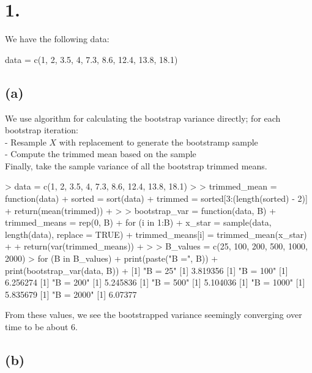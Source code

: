 \documentclass{article}
\begin{document}
\thispagestyle{firstpageheader}
{\Large 

\section*{1.}

We have the following data: 
\begin{spverbatim}
data = c(1, 2, 3.5, 4, 7.3, 8.6, 12.4, 13.8, 18.1)
\end{spverbatim}

\subsection*{(a)} 

We use algorithm for calculating the bootstrap variance directly; for each bootstrap iteration: \\
- Resample \(X\) with replacement to generate the bootstramp sample \\
- Compute the trimmed mean based on the sample \\
Finally, take the sample variance of all the bootstrap trimmed means.

\begin{spverbatim}
> data = c(1, 2, 3.5, 4, 7.3, 8.6, 12.4, 13.8, 18.1)
> 
> trimmed_mean = function(data) {
+   sorted = sort(data)
+   trimmed = sorted[3:(length(sorted) - 2)]
+   return(mean(trimmed))
+ }
> 
> bootstrap_var = function(data, B) {
+   trimmed_means = rep(0, B)
+   for (i in 1:B) {
+     x_star = sample(data, length(data), replace = TRUE)
+     trimmed_means[i] = trimmed_mean(x_star)
+   }
+   return(var(trimmed_means))
+ }
> 
> B_values = c(25, 100, 200, 500, 1000, 2000)
> for (B in B_values) {
+   print(paste("B =", B))
+   print(bootstrap_var(data, B))
+ }
[1] "B = 25"
[1] 3.819356
[1] "B = 100"
[1] 6.256274
[1] "B = 200"
[1] 5.245836
[1] "B = 500"
[1] 5.104036
[1] "B = 1000"
[1] 5.835679
[1] "B = 2000"
[1] 6.07377
\end{spverbatim}

From these values, we see the bootstrapped variance seemingly converging over time to be about 6.

\subsection*{(b)}

}
\end{document}
